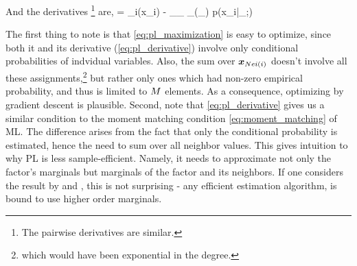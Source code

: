 \eean
And the derivatives \footnote{The pairwise derivatives are similar.} are,
\be
\label{eq:pl_derivative}
 =  \mub_i(x_i) - \sum_{\xx_{}} \mub_{}(\xx_{}) p(x_i|\xx_{};\thetav)
\ee

The first thing to note is that \eqref{eq:pl_maximization} is easy to optimize, since both it and its derivative (\eqref{eq:pl_derivative}) involve only conditional probabilities of indvidual variables. Also, the sum over $\boldsymbol{x}_{Nei(i)}$ doesn't involve all these assignments,\footnote{which would have been exponential in the degree.} but rather only ones which had non-zero empirical probability, and thus is limited to $M$ elements. 
As a consequence, optimizing by gradient descent is plausible.
Second, note that \eqref{eq:pl_derivative} gives us a similar condition to the moment matching condition \eqref{eq:moment_matching} of ML.
The difference arises from the fact that only the conditional probability is estimated, hence the need to sum over all neighbor values.
This gives intuition to why PL is less sample-efficient. Namely, it needs to approximate not only the factor's marginals but marginals of the factor and its neighbors.
If one considers the result by \cite{bresler2014hardness} and \cite{montanari2015computational}, this is not surprising - any efficient estimation algorithm, is bound to use higher order marginals.


